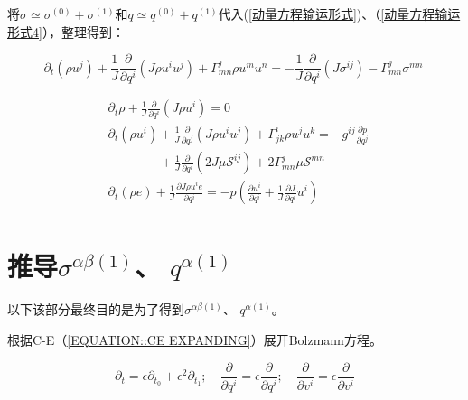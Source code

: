 \documentclass[LBMDerivation.tex]{subfiles}
\begin{document}
将$\sigma\simeq \sigma^{(0)}+\sigma^{(1)}$和$q\simeq q^{(0)}+q^{(1)}$代入(\ref{动量方程输运形式})、（\ref{动量方程输运形式4}），整理得到：


\begin{equation}
  \boxed{
    \partial_{t}\left(\rho u^{j}\right)+\frac{1}{J} \frac{\partial}{\partial q^{i}}\left(J \rho u^{i} u^{j} \right)+\Gamma_{mn}^{j} \rho u^{m} u^{n} = - \frac{1}{J} \frac{\partial}{\partial q^{i}}\left(J \sigma^{ij} \right) -\Gamma_{mn}^{j} \sigma^{mn}
  }
  \label{动量方程输运形式} ~
\end{equation}
%

\begin{equation}
  \boxed{
    \begin{aligned}
       & \partial_{t} \rho+\frac{1}{J} \frac{\partial}{\partial q^{i}}\left(J \rho u^{i}\right)=0
      \\
       & \partial_{t}\left(\rho u^{i}\right)+\frac{1}{J} \frac{\partial}{\partial q^{j}}\left(J \rho u^{i} u^{j}\right)+\Gamma_{j k}^{i} \rho u^{j} u^{k}=-g^{i j} \frac{\partial p}{\partial q^{j}} \\
       & \quad\quad\quad\quad + \frac{1}{J} \frac{\partial}{\partial q^i}(2J\mu \mathcal{S}^{ij}) + 2\Gamma_{mn}^j \mu \mathcal{S}^{mn}                                                              \\
       & \partial_{t}\left(\rho e\right) + \frac{1}{J}\frac{\partial J \rho u^i e}{\partial  q^{i}}  = -  p (\frac{\partial  u^i}{\partial q^{i}}  + \frac{1}{J} \frac{\partial J}{\partial q^i}u^i) \\
    \end{aligned}
  }
  \label{EQUATION::Eluer} ~
\end{equation}





\appendix
\chapter{推导$\sigma^{\alpha\beta(1)}$、 $q^{\alpha (1)}$}
以下该部分最终目的是为了得到$\sigma^{\alpha\beta(1)}$、 $q^{\alpha (1)}$。


根据C-E（\ref{EQUATION::CE EXPANDING}）展开Bolzmann方程。

%
%
$$
  \partial_{t}=\epsilon \partial_{t_{0}}+\epsilon^{2} \partial_{t_{1}} ; \quad \frac{\partial}{\partial q^{i}}=\epsilon \frac{\partial}{\partial q^{i}} ; \quad \frac{\partial}{\partial v^{i}}=\epsilon \frac{\partial}{\partial v^{i}}
$$
\end{document}
